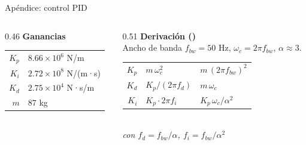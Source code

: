 \documentclass[en,16:9,navbarinline,bigfoot]{sdqbeamer}
\begin{document}
\begin{frame}{Apéndice: control PID}
    \vspace{0.25cm}
    \begin{columns}[T,onlytextwidth]
        \begin{column}{0.46\textwidth}
        \centering\small\textbf{Ganancias}\\[0.18cm]
        \footnotesize
        \begin{tabular}{r@{$\;\approx\;$}l}
            $K_p$ & $8.66\times 10^{6}$ N/m \\[2pt]
            $K_i$ & $2.72\times 10^{8}$ N/(m·s) \\[2pt]
            $K_d$ & $2.75\times 10^{4}$ N·s/m \\[2pt]
            $m$   & $87$ kg \\
        \end{tabular}
        \end{column}
        \begin{column}{0.51\textwidth}
        \centering\small\textbf{Derivación (\cite{Butler2011_PositionControl})}\\[0.18cm]
        \footnotesize
        Ancho de banda $f_{bw}=50$ Hz, $\omega_c = 2\pi f_{bw}$, $\alpha\approx 3$.\\[0.15cm]
        \begin{tabular}{r@{$\;=\;$}l@{$\;\Rightarrow\;$}l}
            $K_p$ & $m\,\omega_c^2$               & $m\,(2\pi f_{bw})^2$ \\[2pt]
            $K_d$ & $K_p / (2\pi f_d)$            & $m\,\omega_c$ \\[2pt]
            $K_i$ & $K_p\cdot 2\pi f_i$           & $K_p\,\omega_c/\alpha^2$ \\
        \end{tabular}\\[0.15cm]
        \scriptsize\itshape con $f_d = f_{bw}/\alpha$,\; $f_i = f_{bw}/\alpha^2$
        \end{column}
    \end{columns}
\end{frame}
\backupend
\end{document}
